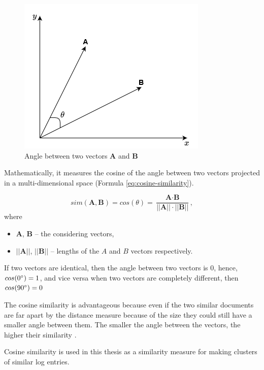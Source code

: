 \documentclass[thesis=M,english]{FITthesis}[2019/12/23]
\begin{document}
\begin{figure}[h!]\centering
	\includegraphics[scale=0.6]{cos_sim}
	\caption{Angle between two vectors \textbf{A} and \textbf{B}}\label{fig:cos_sim}
\end{figure}

Mathematically, it measures the cosine of the angle between two vectors projected in a multi-dimensional space (Formula \ref{eq:cosine-similarity}).

\begin{equation}\label{eq:cosine-similarity}
	sim(\textbf{A}, \textbf{B}) = cos(\theta) = \frac{\textbf{A} \cdot \textbf{B}}{||\textbf{A}|| \cdot ||\textbf{B}||},
\end{equation}
where 
\begin{itemize}
	\item \(\textbf{A}\), \(\textbf{B}\) -- the considering vectors,
	\item \(||\textbf{A}||\), \(||\textbf{B}||\) -- lengths of the \(A\) and \(B\) vectors respectively.
\end{itemize}

If two vectors are identical, then the angle between two vectors is \(0\), hence, \(cos(0\degree) = 1\), and vice versa when two vectors are completely different, then \(cos(90\degree) = 0\)

The cosine similarity is advantageous because even if the two similar documents are far apart by the  distance measure because of the size they could still have a smaller angle between them. The smaller the angle between the vectors, the higher their similarity \cite{cos-similarity}.

Cosine similarity is used in this thesis as a similarity measure for making clusters of similar log entries.

\end{document}
